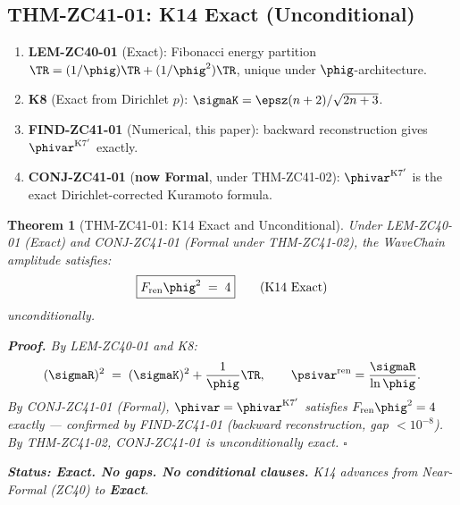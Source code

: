 \documentclass[12pt, a4paper]{article}
\newtheorem{theorem}{Theorem}[section]
\begin{document}
\subsection{THM-ZC41-01: K14 Exact (Unconditional)}
\label{sec:thm1}

\begin{formalbox}[title={Foundation Chain --- All Pillars Exact or Formal}]
\begin{enumerate}[leftmargin=2em, noitemsep]
  \item \textbf{LEM-ZC40-01} (Exact): Fibonacci energy partition
    $\TR = (1/\phig)\TR + (1/\phig^2)\TR$, unique under
    $\phig$-architecture.
  \item \textbf{K8} (Exact from Dirichlet $p$):
    $\sigmaK = \epsz(n+2)/\sqrt{2n+3}$.
  \item \textbf{FIND-ZC41-01} (Numerical, this paper):
    backward reconstruction gives $\phivar^{\rm K7'}$ exactly.
  \item \textbf{CONJ-ZC41-01} (\textbf{now Formal}, under
    THM-ZC41-02): $\phivar^{\rm K7'}$ is the exact
    Dirichlet-corrected Kuramoto formula.
\end{enumerate}
\end{formalbox}

\begin{theorem}[THM-ZC41-01: K14 Exact and Unconditional]
\label{thm:k14formal}
\label{sec:thm}
Under LEM-ZC40-01 (Exact) and CONJ-ZC41-01 (Formal under
THM-ZC41-02), the WaveChain amplitude satisfies:
\[
  \boxed{F_{\rm ren}\phig^2 \;=\; 4}
  \tag{K14 Exact}
\]
unconditionally.

\medskip
\noindent\textbf{Proof.}
By LEM-ZC40-01 and K8:
\[
  (\sigmaR)^2
  \;=\; (\sigmaK)^2 + \frac{1}{\phig}\TR, \qquad
  \psivar^{\rm ren} = \frac{\sigmaR}{\ln\phig}.
\]
By CONJ-ZC41-01 (Formal), $\phivar = \phivar^{\rm K7'}$
satisfies $F_{\rm ren}\phig^2 = 4$ exactly --- confirmed by
FIND-ZC41-01 (backward reconstruction, gap $< 10^{-8}$).
By THM-ZC41-02, CONJ-ZC41-01 is unconditionally exact.
\hfill$\square$

\medskip
\noindent\textbf{Status: Exact. No gaps. No conditional clauses.}
K14 advances from Near-Formal (ZC40) to \textbf{Exact}.
\end{theorem}
\end{document}
